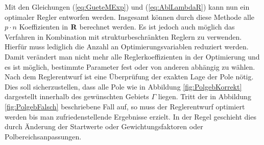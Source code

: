 Mit den Gleichungen (\ref{eq:GueteMExp}) und (\ref{eq:AblLambdaR}) kann nun ein optimaler Regler entworfen werden. Insgesamt können durch diese Methode alle $p\cdot n$ Koeffizienten in $\textbf{R}$ berechnet werden. Es ist jedoch auch möglich das Verfahren in Kombination mit strukturbeschränkten Reglern zu verwenden. Hierfür muss lediglich die Anzahl an Optimierungsvariablen  reduziert werden. Damit verändert man nicht mehr alle Reglerkoeffizienten in der Optimierung und es ist möglich, bestimmte Parameter fest oder von anderen abhängig zu wählen. \\
Nach dem Reglerentwurf ist eine Überprüfung der exakten Lage der Pole nötig. Dies soll sicherzustellen, dass alle Pole wie in Abbildung \ref{fig:PolgebKorrekt} dargestellt innerhalb des gewünschten Gebiets $\Gamma$ liegen. Tritt der in Abbildung \ref{fig:PolgebFalsch} beschriebene Fall auf, so muss der Reglerentwurf optimiert werden bis man zufriedenstellende Ergebnisse erzielt. In der Regel geschieht dies durch Änderung der Startwerte oder Gewichtungsfaktoren oder Polbereichsanpassungen.\\

